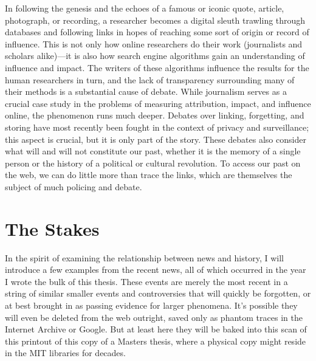 In following the genesis and the echoes of a famous or iconic quote, article, photograph, or recording, a researcher becomes a digital sleuth trawling through databases and following links in hopes of reaching some sort of origin or record of influence. This is not only how online researchers do their work (journalists and scholars alike)---it is also how search engine algorithms gain an understanding of influence and impact. The writers of these algorithms influence the results for the human researchers in turn, and the lack of transparency surrounding many of their methods is a substantial cause of debate. While journalism serves as a crucial case study in the problems of measuring attribution, impact, and influence online, the phenomenon runs much deeper. Debates over linking, forgetting, and storing have most recently been fought in the context of privacy and surveillance; this aspect is crucial, but it is only part of the story. These debates also consider what will and will not constitute our past, whether it is the memory of a single person or the history of a political or cultural revolution. To access our past on the web, we can do little more than trace the links, which are themselves the subject of much policing and debate.

\section{The Stakes}

In the spirit of examining the relationship between news and history, I will introduce a few examples from the recent news, all of which occurred in the year I wrote the bulk of this thesis. These events are merely the most recent in a string of similar smaller events and controversies that will quickly be forgotten, or at best brought in as passing evidence for larger phenomena. It's possible they will even be deleted from the web outright, saved only as phantom traces in the Internet Archive or Google. But at least here they will be baked into this scan of this printout of this copy of a Masters thesis, where a physical copy might reside in the MIT libraries for decades.

